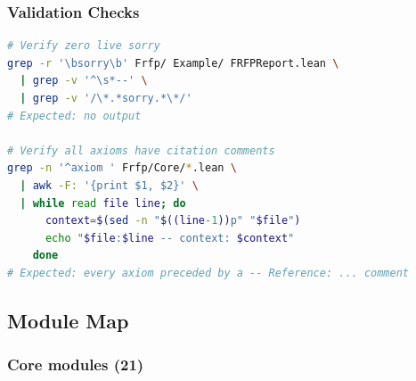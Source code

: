 \subsubsection*{Validation Checks}

\begin{lstlisting}[language=bash]
# Verify zero live sorry
grep -r '\bsorry\b' Frfp/ Example/ FRFPReport.lean \
  | grep -v '^\s*--' \
  | grep -v '/\*.*sorry.*\*/'
# Expected: no output

# Verify all axioms have citation comments
grep -n '^axiom ' Frfp/Core/*.lean \
  | awk -F: '{print $1, $2}' \
  | while read file line; do
      context=$(sed -n "$((line-1))p" "$file")
      echo "$file:$line -- context: $context"
    done
# Expected: every axiom preceded by a -- Reference: ... comment
\end{lstlisting}

\subsection{Module Map}

\subsubsection*{Core modules (21)}

